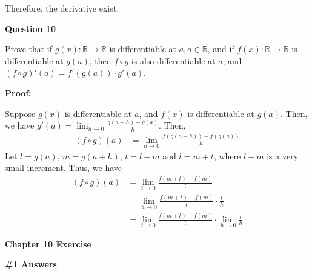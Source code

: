 \documentclass[a4paper,12pt]{report}
\begin{document}
\noindent
Therefore, the derivative exist. 

\noindent
\textbf{Question 10}

\noindent
Prove that if $g(x):\mathbb{R}\rightarrow \mathbb{R}$ is differentiable at $a, a\in \mathbb{R}$, and if $f(x): \mathbb{R}\rightarrow \mathbb{R}$ is differentiable at $g(a)$, then $f\circ g$ is also differentiable at $a$, and $(f\circ g)'(a)=f'(g(a))\cdot{g'(a)}$.

\noindent
\textbf{Proof: }

\noindent
Suppose $g(x)$ is differentiable at $a$, and $f(x)$ is differentiable at $g(a)$. Then, we have $g'(a)=\displaystyle{\lim_{h\to 0}}\frac{g(a+h)-g(a)}{h}$. 
Then,
\begin{align*}
(f\circ g)(a)&=\displaystyle{\lim_{h\to 0}}\frac{f(g(a+h))-f(g(a))}{h}
\end{align*}
Let $l=g(a)$, $m=g(a+h)$, $t=l-m$ and $l=m+t$, where $l-m$ is a very small increment. Thus, we have 
\begin{align*}
(f\circ g)(a)&=\displaystyle{\lim_{t\to 0}}\frac{f(m+t)-f(m)}{t}\\
&=\displaystyle{\lim_{h\to 0}}\frac{f(m+t)-f(m)}{t}\cdot{\frac{t}{h}}\\
&=\displaystyle{\lim_{t\to 0}}\frac{f(m+t)-f(m)}{t}\cdot{\displaystyle{\lim_{h\to 0}}\frac{t}{h}}
\end{align*}

\noindent
\textbf{Chapter 10 Exercise}

\noindent
\textbf{\#1 Answers}
\end{document}
